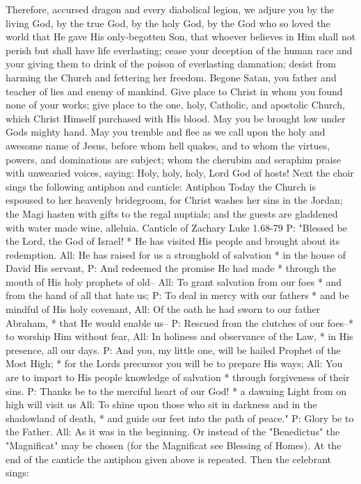 Therefore, accursed dragon and every diabolical legion, we adjure you by the living God, by the true God, by the holy God, by the God who so loved the world that He gave His only-begotten Son, that whoever believes in Him shall not perish but shall have life everlasting; cease your deception of the human race and your giving them to drink of the poison of everlasting damnation; desist from harming the Church and fettering her freedom. Begone Satan, you father and teacher of lies and enemy of mankind. Give place to Christ in whom you found none of your works; give place to the one, holy, Catholic, and apostolic Church, which Christ Himself purchased with His blood. May you be brought low under Gods mighty hand. May you tremble and flee as we call upon the holy and awesome name of Jesus, before whom hell quakes, and to whom the virtues, powers, and dominations are subject; whom the cherubim and seraphim praise with unwearied voices, saying: Holy, holy, holy, Lord God of hosts!
Next the choir sings the following antiphon and canticle:
Antiphon
Today the Church is espoused to her heavenly bridegroom, for Christ washes her sins in the Jordan; the Magi hasten with gifts to the regal nuptials; and the guests are gladdened with water made wine, alleluia.
Canticle of Zachary
Luke 1.68-79
P: "Blessed be the Lord, the God of Israel! * He has visited His people and brought about its redemption.
All: He has raised for us a stronghold of salvation * in the house of David His servant,
P: And redeemed the promise He had made * through the mouth of His holy prophets of old--
All: To grant salvation from our foes * and from the hand of all that hate us;
P: To deal in mercy with our fathers * and be mindful of His holy covenant,
All: Of the oath he had sworn to our father Abraham, * that He would enable us--
P: Rescued from the clutches of our foes--* to worship Him without fear,
All: In holiness and observance of the Law, * in His presence, all our days.
P: And you, my little one, will be hailed Prophet of the Most High; * for the Lords precursor you will be to prepare His ways;
All: You are to impart to His people knowledge of salvation * through forgiveness of their sins.
P: Thanks be to the merciful heart of our God! * a dawning Light from on high will visit us
All: To shine upon those who sit in darkness and in the shadowland of death, * and guide our feet into the path of peace."
P: Glory be to the Father.
All: As it was in the beginning.
Or instead of the "Benedictus" the "Magnificat" may be chosen (for the Magnificat see Blessing of Homes). At the end of the canticle the antiphon given above is repeated. Then the celebrant sings: 
